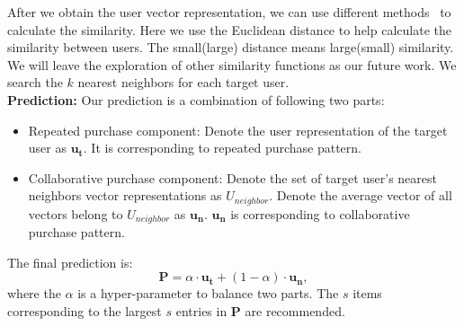 \documentclass[sigconf]{acmart}
\begin{document}
After we obtain the user vector representation, we can use different methods~\cite{sarwar2001item} to calculate the similarity. Here we use the  Euclidean distance to help calculate the similarity between users. The small(large) distance means  large(small) similarity. We will leave the  exploration of other similarity functions as our future work.  We search the $k$  nearest neighbors for each target user. 
\\
\textbf{Prediction:} 
Our prediction is a  combination of  following two parts:
\begin{itemize} 
\item{Repeated purchase  component:} Denote the user representation of the target user as  $\mathbf{u_t}$. It  is corresponding to  repeated purchase  pattern. 
\item{Collaborative purchase component:}  Denote the set of  target user's nearest neighbors vector representations as  $U_{neighbor}$. Denote  the average vector of  all vectors belong to  $U_{neighbor}$ as $\mathbf{u_n}$. $\mathbf{u_n}$ is corresponding to collaborative purchase pattern. 
\end{itemize}
The final prediction is: $$\mathbf{P} = \alpha\cdot\mathbf{u_t}+(1-\alpha)\cdot\mathbf{u_n},$$ where the $\alpha$ is a hyper-parameter to balance two parts. The $s$ items  corresponding to the largest  $s$ entries in  $\mathbf{P}$ are recommended.   
\end{document}
